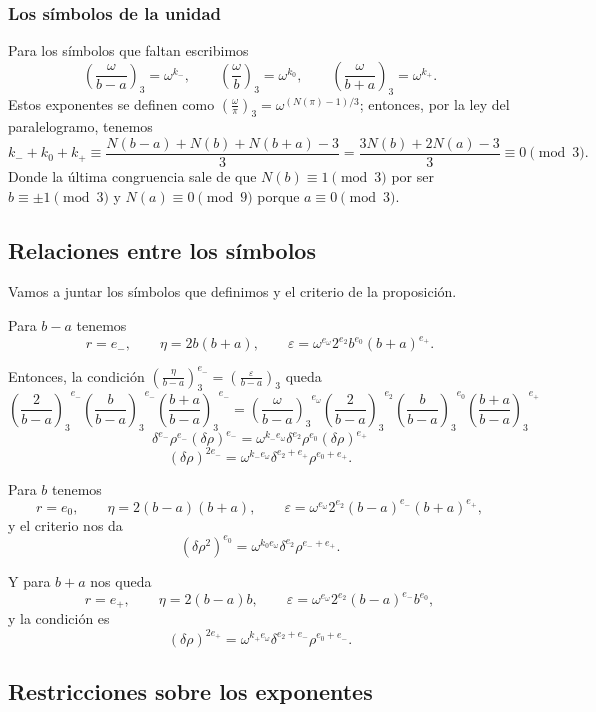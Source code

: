 \documentclass[a4paper]{book}
\theoremstyle{definition}
\theoremstyle{plain}
\newcommand{\cub}[2]{\left(\frac{#1}{#2}\right)_3}
\begin{document}
\subsubsection*{Los símbolos de la unidad}\label{subsec:simbolosOmega}

Para los símbolos que faltan escribimos
\[
\cub{\omega}{b-a}=\omega^{k_-},\qquad
\cub{\omega}{b}=\omega^{k_0},\qquad
\cub{\omega}{b+a}=\omega^{k_+}.
\]
Estos exponentes se definen como $\cub{\omega}{\pi}=\omega^{(N(\pi)-1)/3}$; entonces, por la ley del paralelogramo, tenemos
\[
k_-+k_0+k_+ \equiv\frac{N(b-a)+N(b)+N(b+a)-3}{3}=\frac{3N(b)+2N(a)-3}{3}\equiv0\pmod3.
\]
Donde la última congruencia sale de que $N(b)\equiv1\pmod3$ por ser $b\equiv \pm 1 \pmod3$ y $N(a)\equiv0\pmod9$ porque $a \equiv0\pmod3$.

\subsection*{Relaciones entre los símbolos}

Vamos a juntar los símbolos que definimos y el criterio de la proposición.

Para $b-a$ tenemos
\[
r=e_-,\qquad \eta=2b(b+a),\qquad \varepsilon=\omega^{e_\omega}2^{e_2}b^{e_0}{(b+a)}^{e_+}.
\]

Entonces, la condición $\cub{\eta}{b-a}^{e_-}=\cub{\varepsilon}{b-a}$ queda
\[
{\cub{2}{b-a}}^{e_-} {\cub{b}{b-a}}^{e_-} {\cub{b+a}{b-a}}^{e_-} = {\cub{\omega}{b-a}}^{e_\omega} {\cub{2}{b-a}}^{e_2} {\cub{b}{b-a}}^{e_0} {\cub{b+a}{b-a}}^{e_+} 
\]
\[
\delta^{e_-} \rho^{e_-} {(\delta\rho)}^{e_-} = \omega^{k_- e_\omega} \delta^{e_2} \rho^{e_0} {(\delta\rho)}^{e_+}
\]
\[
{(\delta\rho)}^{2e_-} =\omega^{k_-e_\omega}\delta^{e_2+e_+}\rho^{e_0+e_+}.
\]

Para $b$ tenemos
\[
r=e_0,\qquad \eta=2(b-a)(b+a),\qquad
\varepsilon=\omega^{e_\omega}2^{e_2}{(b-a)}^{e_-}{(b+a)}^{e_+},
\]
y el criterio nos da
\[
{(\delta\rho^2)}^{e_0}
=\omega^{k_0e_\omega}\delta^{e_2}\rho^{e_-+e_+}.
\]

Y para $b+a$ nos queda
\[
r=e_+,\qquad \eta=2(b-a)b,\qquad \varepsilon=\omega^{e_\omega}2^{e_2}{(b-a)}^{e_-}b^{e_0},
\]
y la condición es
\[
{(\delta\rho)}^{2e_+} =\omega^{k_+e_\omega}\delta^{e_2+e_-}\rho^{e_0+e_-}.
\]

\subsection{Restricciones sobre los exponentes}
\end{document}
